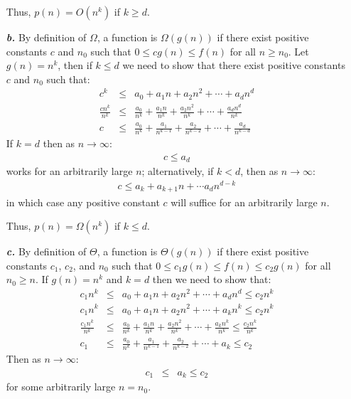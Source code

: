 \documentclass{article}
\begin{document}
\begin{enumerate}
		Thus, $p(n) = O(n^k)$ if $k \geq d$.
	\item[\textbf{\textit{b.}}] By definition of $\Omega$, a function is $\Omega(g(n))$ if there exist positive constants $c$ and $n_0$ such that $0 \leq c g(n) \leq f(n)$ for all $n \geq n_0$. Let $g(n) = n^k$, then if $k \leq d$ we need to show that there exist positive constants $c$ and $n_0$ such that:
		\begin{eqnarray*}
			c^k & \leq & a_0 + a_1 n + a_2 n^2 + \cdots + a_d n^d \\
			\frac{c n^k}{n^k} & \leq & \frac{a_0}{n^k} + \frac{a_1 n}{n^k} + \frac{a_2 n^2}{n^k} + \cdots + \frac{a_d n^d}{n^k} \\
			c & \leq & \frac{a_0}{n^k} + \frac{a_1}{n^{k-1}} + \frac{a_2}{n^{k-2}} + \cdots + \frac{a_d}{n^{k-d}}
		\end{eqnarray*}
		If $k = d$ then as $n \rightarrow \infty$:
		\begin{eqnarray*}
			c \leq a_d
		\end{eqnarray*}
		works for an arbitrarily large $n$; alternatively, if $k < d$, then as $n \rightarrow \infty$:
		\begin{eqnarray*}
			c \leq a_k + a_{k+1}n + \cdots a_d n^{d-k}
		\end{eqnarray*}
		in which case any positive constant $c$ will suffice for an arbitrarily large $n$.

		Thus, $p(n) = \Omega(n^k)$ if $k \leq d$.
	\item[\textbf{\textit{c.}}] By definition of $\Theta$, a function is $\Theta(g(n))$ if there exist positive constants $c_1$, $c_2$, and $n_0$ such that $0 \leq c_1 g(n) \leq f(n) \leq c_2 g(n)$ for all $n_0 \geq n$. If $g(n) = n^k$ and $k = d$ then we need to show that:
		\begin{eqnarray*}
			c_1 n^k & \leq & a_0 + a_1 n + a_2 n^2 + \cdots + a_d n^d \leq c_2 n^k \\
			c_1 n^k & \leq & a_0 + a_1 n + a_2 n^2 + \cdots + a_k n^k \leq c_2 n^k \\
			\frac{c_1 n^k}{n^k} & \leq & \frac{a_0}{n^k} + \frac{a_1 n}{n^k} + \frac{a_2 n^2}{n^k} + \cdots + \frac{a_k n^k}{n^k} \leq \frac{c_2 n^k}{n^k} \\
			c_1 & \leq & \frac{a_0}{n^k} + \frac{a_1}{n^{k-1}} + \frac{a_2}{n^{k-2}} + \cdots + a_k \leq c_2
		\end{eqnarray*}
		Then as $n \rightarrow \infty$:
		\begin{eqnarray*}
			c_1 & \leq & a_k \leq c_2
		\end{eqnarray*}
		for some arbitrarily large $n = n_0$.


\end{enumerate}
\end{document}
